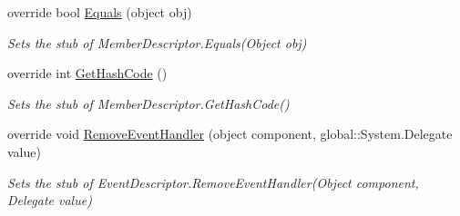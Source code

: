 \begin{DoxyCompactItemize}
override bool \hyperlink{class_system_1_1_component_model_1_1_fakes_1_1_stub_event_descriptor_a49ae6601f8815d0eb436e165b0bc1329}{Equals} (object obj)
\begin{DoxyCompactList}\small\item\em Sets the stub of Member\-Descriptor.\-Equals(\-Object obj)\end{DoxyCompactList}\item 
override int \hyperlink{class_system_1_1_component_model_1_1_fakes_1_1_stub_event_descriptor_a754907c901cd607cdfbb4e63b5489aa4}{Get\-Hash\-Code} ()
\begin{DoxyCompactList}\small\item\em Sets the stub of Member\-Descriptor.\-Get\-Hash\-Code()\end{DoxyCompactList}\item 
override void \hyperlink{class_system_1_1_component_model_1_1_fakes_1_1_stub_event_descriptor_a5cfc1cd18545d9947eb5df61355b45f2}{Remove\-Event\-Handler} (object component, global\-::\-System.\-Delegate value)
\begin{DoxyCompactList}\small\item\em Sets the stub of Event\-Descriptor.\-Remove\-Event\-Handler(\-Object component, Delegate value)\end{DoxyCompactList}\end{DoxyCompactItemize}

